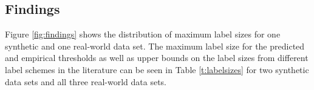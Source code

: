%


\subsection{Findings}
Figure \ref{fig:findings} shows the distribution of maximum label sizes for one synthetic and one real-world data set. The maximum label size
for the predicted and empirical thresholds as well as upper bounds on the label sizes from different label schemes in the literature can be seen in Table \ref{t:labelsizes} for two synthetic
data sets and all three real-world data sets. 


